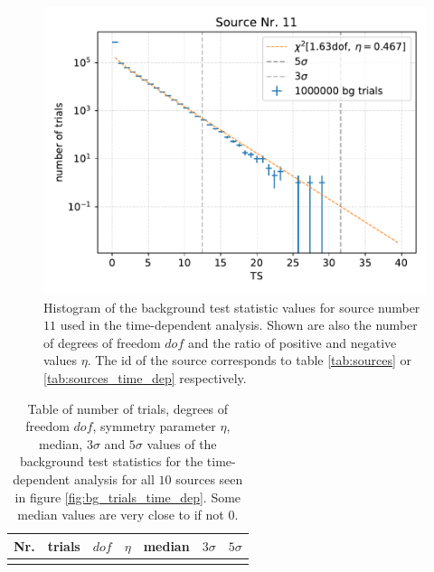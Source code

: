 \begin{figure}
    \centering
    \includegraphics[width=\linewidth]{Plots/05_csky/9_years_gfu_gold_time_dep_bg_t0_1.pdf}
    \caption{Histogram of the background test statistic values for source number $\num{11}$ used in the time-dependent analysis. Shown are also the number of degrees of freedom $dof$ and the ratio of positive and negative values $\eta$. The id of the source corresponds to table \ref{tab:sources} or \ref{tab:sources_time_dep} respectively.}
    \label{fig:bg_trials_time_dep_1}
\end{figure}
\begin{table}
  \centering
  \caption[]{Table of number of trials, degrees of freedom $dof$, symmetry parameter $\eta$, median, $\num{3}\sigma$ and $\num{5}\sigma$ values of the background test statistics for the time-dependent analysis for all $\num{10}$ sources seen in figure \ref{fig:bg_trials_time_dep}. Some median values are very close to if not $\num{0}$.}
  \begin{tabular}{crccccc}
    \toprule
    Nr. & trials & $dof$ & $\eta$ & median & $\num{3}\sigma$ & $\num{5}\sigma$ \\
    \toprule
      
    \toprule
    \label{tab:sigma_time_dep}
  \end{tabular}
\end{table}
